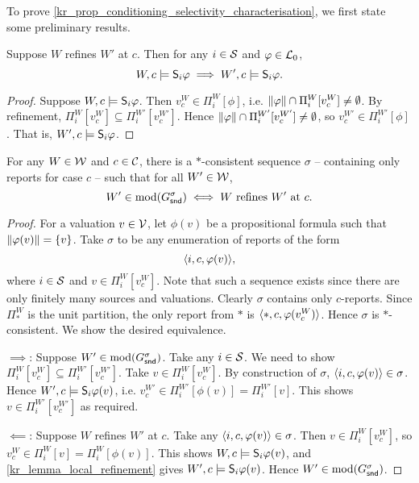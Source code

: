 To prove \cref{kr_prop_conditioning_selectivity_characterisation}, we first
state some preliminary results.

\begin{lemma}
    \label{kr_lemma_local_refinement}
    Suppose $W$ refines $W'$ at $c$. Then for any $i \in \srcs$ and $\phi \in
    \lprop$,
    \[
        W, c \models \S_i\phi
        \implies
        W', c \models \S_i\phi.
    \]
\end{lemma}

\begin{proof}
    Suppose $W, c \models \S_i\phi$. Then $v^W_c \in \Pi^W_i[\phi]$, i.e.
    $\propmods{\phi} \cap \Pi^W_i[v^W_c] \ne \emptyset$. By refinement,
    $\Pi^W_i[v^W_c] \subseteq \Pi^{W'}_i[v^{W'}_c]$. Hence $\propmods{\phi}
    \cap \Pi^{W'}_i[v^{W'}_c] \ne \emptyset$, so $v^{W'}_c \in
    \Pi^{W'}_i[\phi]$. That is, $W', c \models \S_i\phi$.
\end{proof}

\begin{lemma}
    \label{kr_lemma_local_refinement_sequence}
    For any $W \in \W$ and $c \in \C$, there is a $\ast$-consistent sequence
    $\sigma$ -- containing only reports for case $c$ -- such that for all $W'
    \in \W$,
    \[
        W' \in \mods(G^\sigma_\snd)
        \iff
        W \text{ refines } W' \text{ at } c.
    \]
\end{lemma}

\begin{proof}

    For a valuation $v \in \vals$, let $\phi(v)$ be a propositional formula
    such that $\propmods{\phi(v)} = \{v\}$. Take $\sigma$ to be any enumeration
    of reports of the form
    \[
        \tuple{i, c, \phi(v)},
    \]
    where $i \in \srcs$ and $v \in \Pi^W_i[v^W_c]$. Note that such a sequence
    exists since there are only finitely many sources and valuations. Clearly
    $\sigma$ contains only $c$-reports. Since $\Pi^W_\ast$ is the unit
    partition, the only report from $\ast$ is $\tuple{\ast, c, \phi(v^W_c)}$.
    Hence $\sigma$ is $\ast$-consistent. We show the desired equivalence.

    $\implies$: Suppose $W' \in \mods(G^\sigma_\snd)$. Take any $i \in \srcs$. We
    need to show $\Pi^W_i[v^W_c] \subseteq \Pi^{W'}_i[v^{W'}_c]$. Take $v \in
    \Pi^W_i[v^W_c]$. By construction of $\sigma$, $\tuple{i, c, \phi(v)} \in
    \sigma$. Hence $W', c \models \S_i\phi(v)$, i.e. $v^{W'}_c \in
    \Pi^{W'}_i[\phi(v)] = \Pi^{W'}_i[v]$. This shows $v \in
    \Pi^{W'}_i[v^{W'}_c]$ as required.

    $\impliedby$: Suppose $W$ refines $W'$ at $c$. Take any $\tuple{i, c,
    \phi(v)} \in \sigma$. Then $v \in \Pi^W_i[v^W_c]$, so $v^W_c \in \Pi^W_i[v]
    = \Pi^W_i[\phi(v)]$. This shows $W, c \models \S_i\phi(v)$, and
    \cref{kr_lemma_local_refinement} gives $W', c \models \S_i\phi(v)$. Hence $W'
    \in \mods(G^\sigma_\snd)$.
\end{proof}

